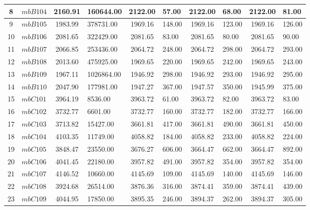 \documentclass[a4paper,12pt]{report}
\begin{document}
\begin{longtable}{|c|l|c|p{1.5cm}|c|p{1cm}|c|p{1cm}|c|p{1cm}|}
8&$mbB104$ &    2160.91 & 160644.00 &    2122.00 &      57.00 &    2122.00 &      68.00 &    2122.00 &      81.00\\ \hline 
9&$mbB105$ &    1983.99 & 378731.00 &    1969.16 &     148.00 &    1969.16 &     123.00 &    1969.16 &     126.00\\ \hline 
10&$mbB106$ &    2081.65 & 322429.00 &    2081.65 &      83.00 &    2081.65 &      80.00 &    2081.65 &      90.00\\ \hline 
11&$mbB107$ &    2066.85 & 253436.00 &    2064.72 &     248.00 &    2064.72 &     298.00 &    2064.72 &     293.00\\ \hline 
12&$mbB108$ &    2013.60 & 475925.00 &    1969.65 &     220.00 &    1969.65 &     242.00 &    1969.65 &     243.00\\ \hline 
13&$mbB109$ &    1967.11 &1026864.00 &    1946.92 &     298.00 &    1946.92 &     293.00 &    1946.92 &     295.00\\ \hline 
14&$mbB110$ &    2047.90 & 177981.00 &    1947.27 &     367.00 &    1947.57 &     350.00 &    1945.99 &     375.00\\ \hline 
15&$mbC101$ &    3964.19 &   8536.00 &    3963.72 &      61.00 &    3963.72 &      82.00 &    3963.72 &      83.00\\ \hline 
16&$mbC102$ &    3732.77 &   6601.00 &    3732.77 &     160.00 &    3732.77 &     182.00 &    3732.77 &     166.00\\ \hline 
17&$mbC103$ &    3713.82 &  15427.00 &    3661.81 &     417.00 &    3661.81 &     490.00 &    3661.81 &     450.00\\ \hline 
18&$mbC104$ &    4103.35 &  11749.00 &    4058.82 &     184.00 &    4058.82 &     233.00 &    4058.82 &     224.00\\ \hline 
19&$mbC105$ &    3848.47 &  23550.00 &    3676.27 &     606.00 &    3664.47 &     662.00 &    3664.47 &     892.00\\ \hline 
20&$mbC106$ &    4041.45 &  22180.00 &    3957.82 &     491.00 &    3957.82 &     354.00 &    3957.82 &     354.00\\ \hline 
21&$mbC107$ &    4146.52 &  10660.00 &    4145.69 &     109.00 &    4145.69 &     140.00 &    4145.69 &     146.00\\ \hline 
22&$mbC108$ &    3924.68 &  26514.00 &    3876.36 &     316.00 &    3874.41 &     359.00 &    3874.41 &     439.00\\ \hline 
23&$mbC109$ &    4044.95 &  17850.00 &    3895.35 &     246.00 &    3894.37 &     262.00 &    3894.37 &     305.00\\ \hline 

\end{longtable}
\end{document}
